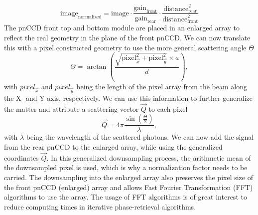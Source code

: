 \begin{equation}
\text{image}_{\text{normalized}} = \text{image}\cdot \frac{\text{gain}_{\text{front}}}{\text{gain}_{\text{rear}}} \cdot \frac{\text{distance}_{\text{rear}}^{2}}{\text{distance}_{\text{front}}^{2}}
\end{equation}
The pnCCD front top and bottom module are placed in an enlarged array to reflect the real geometry in the plane of the front pnCCD. We can now translate this with a pixel constructed geometry to use the more general scattering angle $\Theta$
\begin{equation}
\Theta = \arctan\left(\frac{\sqrt{\text{pixel}_{\vec{x}}^{2}+\text{pixel}_{\vec{y}}^{2}}\times a}{d}\right),
\label{eqn:scattering-angle}
\end{equation}
with $pixel_{\vec{x}}$ and $pixel_{\vec{y}}$ being the length of the pixel array from the beam along the X- and Y-axis, respectively. We can use this information to further generalize the matter and attribute a scattering vector $\vec{Q}$ to each pixel
\begin{equation}
\vec{Q} = 4 \pi \frac{\sin\left(\frac{\Theta}{2}\right)}{\lambda},
\label{eqn:q-vector}
\end{equation}
with $\lambda$ being the wavelength of the scattered photons. We can now add the signal from the rear pnCCD to the enlarged array, while using the generalized coordinates $\vec{Q}$. In this generalized downsampling process, the arithmetic mean of the downsampled pixel is used, which is why a normalization factor needs to be carried. The downsampling into the enlarged array also  preserves the pixel size of the front pnCCD (enlarged) array and allows Fast Fourier Transformation (FFT) algorithms to use the array. The usage of FFT algorithms is of great interest to reduce computing times in iterative phase-retrieval algorithms.\\
%
%
%
